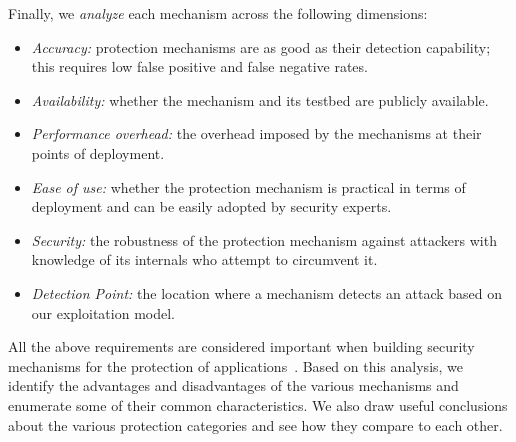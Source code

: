 \documentclass[10pt,journal,compsoc]{IEEEtran}
\begin{document}
Finally, we {\it analyze} each mechanism across the
following dimensions:
\begin{itemize}
\item {\it Accuracy:} protection mechanisms are as good
  as their detection capability; this requires low false positive and
  false negative rates.
\item {\it Availability:} whether the mechanism and its
  testbed are publicly available.
\item {\it Performance overhead:} the 
  overhead imposed by the mechanisms at their points of deployment.
\item {\it Ease of use:} whether the protection
  mechanism is practical in terms of deployment
  and can be easily adopted by security experts.
\item {\it Security:} the robustness of the protection mechanism against
  attackers with knowledge of its internals who attempt to circumvent it.
\item {\it Detection Point:} the location where a mechanism detects an attack
  based on our exploitation model.
\end{itemize}

\noindent
All the above requirements are considered important
when building security mechanisms for the protection of
applications~\cite{A01,A00,SPWS13,nature2014}.
Based on this analysis, we identify the advantages
and disadvantages of the
various mechanisms and enumerate some of their common
characteristics. We also draw useful conclusions
about the various protection categories and see how they compare
to each other.

\end{document}
